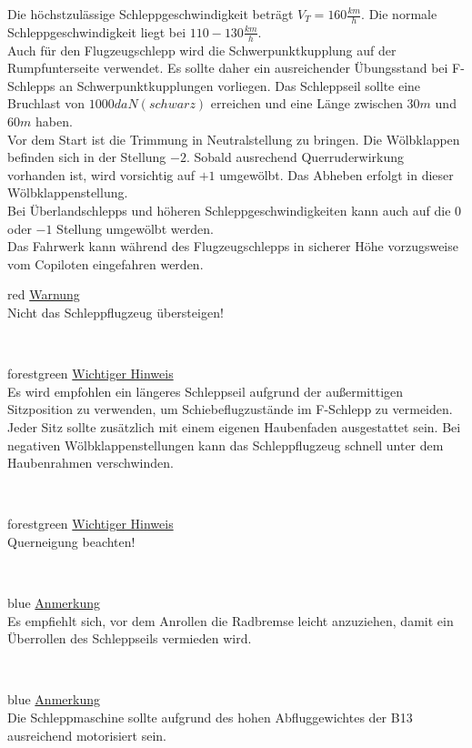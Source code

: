 Die höchstzulässige Schleppgeschwindigkeit beträgt $V_T=160 \frac{km}{h}$. Die normale Schleppgeschwindigkeit liegt bei $110-130 \frac{km}{h}$. \\
Auch für den Flugzeugschlepp wird die Schwerpunktkupplung auf der Rumpfunterseite verwendet. Es sollte daher ein ausreichender Übungsstand bei F-Schlepps an Schwerpunktkupplungen vorliegen. Das Schleppseil sollte eine Bruchlast von $1000 daN (schwarz)$ erreichen und eine Länge zwischen $30m$ und $60m$ haben.\\
Vor dem Start ist die Trimmung in Neutralstellung zu bringen. Die Wölbklappen befinden sich in der Stellung $-2$. Sobald ausrechend Querruderwirkung vorhanden ist, wird vorsichtig auf $+1$ umgewölbt. Das Abheben erfolgt in dieser Wölbklappenstellung. \\
Bei Überlandschlepps und höheren Schleppgeschwindigkeiten kann auch auf die $0$ oder  $-1$ Stellung umgewölbt werden.\\
Das Fahrwerk kann während des Flugzeugschlepps in sicherer Höhe vorzugsweise vom Copiloten eingefahren werden.\\
\newline
\begin{color}{red}
\large{\underline{Warnung}}\\
Nicht das Schleppflugzeug übersteigen!
\end{color}\\
\newline
\begin{color}{forestgreen}
\large{\underline{Wichtiger Hinweis}}\\
Es wird empfohlen ein längeres Schleppseil aufgrund der außermittigen Sitzposition zu verwenden, um Schiebeflugzustände im F-Schlepp zu 	vermeiden. Jeder Sitz sollte zusätzlich mit einem eigenen Haubenfaden ausgestattet sein. Bei negativen Wölbklappenstellungen kann das Schleppflugzeug schnell unter dem Haubenrahmen verschwinden.
\end{color}\\
\newline
\begin{color}{forestgreen}
\large{\underline{Wichtiger Hinweis}}\\
Querneigung beachten!
\end{color}\\
\newline
\begin{color}{blue}
\large{\underline{Anmerkung}}\\
Es empfiehlt sich, vor dem Anrollen die Radbremse leicht anzuziehen, damit ein	Überrollen des Schleppseils vermieden wird. 
\end{color}\\
\begin{color}{blue}
\large{\underline{Anmerkung}}\\
Die Schleppmaschine sollte aufgrund des hohen Abfluggewichtes der B13 ausreichend motorisiert sein.
\end{color}\\

